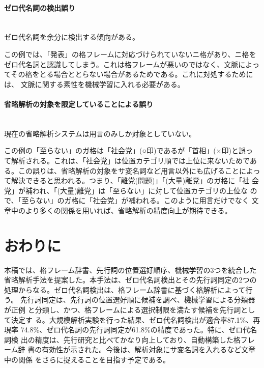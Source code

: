 \documentclass{nlp}
\begin{document}
\vspace*{-2ex}

\paragraph{ゼロ代名詞の検出誤り} \ \\[5pt]
ゼロ代名詞を余分に検出する傾向がある。


\noindent
この例では、「発表」の格フレームに対応づけられていないニ格があり、ニ格を
ゼロ代名詞と認識してしまう。これは格フレームが悪いのではなく、文脈によっ
てその格をとる場合ととらない場合があるためである。これに対処するためには、
文脈に関する素性を機械学習に入れる必要がある。


\paragraph{省略解析の対象を限定していることによる誤り} \ \\[5pt]
現在の省略解析システムは用言のみしか対象としていない。


\noindent
この例の「至らない」のガ格は「社会党」(○印)であるが「首相」(×印)と誤っ
て解析される。これは、「社会党」は位置カテゴリ順では上位に来ないためであ
る。この誤りは、省略解析の対象をサ変名詞など用言以外にも広げることによっ
て解決できると思われる。つまり、「離党(問題)」「(大量)離党」のガ格に「社
会党」が補われ、「(大量)離党」は「至らない」に対して位置カテゴリの上位な
ので、「至らない」のガ格に「社会党」が補われる。このように用言だけでなく
文章中のより多くの関係を用いれば、省略解析の精度向上が期待できる。


\section{おわりに}

本稿では、格フレーム辞書、先行詞の位置選好順序、機械学習の3つを統合した
省略解析手法を提案した。本手法は、ゼロ代名詞検出とその先行詞同定の2つの
処理からなる。ゼロ代名詞検出は、格フレーム辞書に基づく格解析によって行う。
先行詞同定は、先行詞の位置選好順に候補を調べ、機械学習による分類器が正例
と分類し、かつ、格フレームによる選択制限を満たす候補を先行詞として決定す
る。大規模解析実験を行った結果、ゼロ代名詞検出が適合率87.1\%、再現率
74.8\%、ゼロ代名詞の先行詞同定が61.8\%の精度であった。特に、ゼロ代名詞検
出の精度は、先行研究と比べてかなり向上しており、自動構築した格フレーム辞
書の有効性が示された。今後は、解析対象にサ変名詞を入れるなど文章中の関係
をさらに捉えることを目指す予定である。
\end{document}
